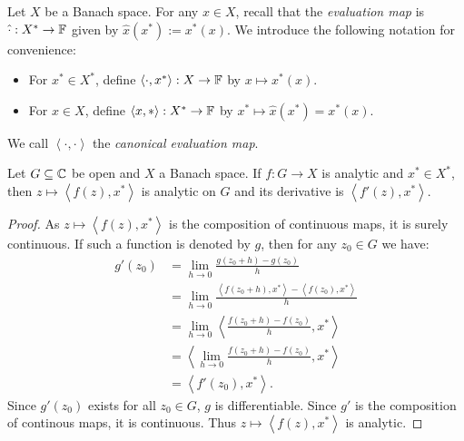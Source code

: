 \begin{remark}
	Let $X$ be a Banach space. For any $x \in X$, recall that the \emph{evaluation map} is $\hat{\cdot}:X^\ast \rightarrow \mathbb{F}$ given by $\hat{x}(x^\ast) := x^\ast(x)$. We introduce the following notation for convenience:
	\mbox{}
	\begin{itemize}[itemsep=1pt,topsep=3pt]
		\item For $x^\ast \in X^\ast$, define $\left<\cdot, x^\ast \right>:X \rightarrow \mathbb{F}$ by $x \mapsto x^\ast(x)$.
		\item For $x \in X$, define $\left<x,\ast \right> :X^\ast \rightarrow \mathbb{F}$ by $x^\ast \mapsto \hat{x}(x^\ast) = x^\ast (x)$.
	\end{itemize}
	We call $\left<\cdot,\cdot \right>$ the \emph{canonical evaluation map}.
\end{remark}


\begin{proposition}
	Let $G \subseteq \mathbb{C}$ be open and $X$ a Banach space. If $f:G \rightarrow X$ is analytic and $x^\ast \in X^\ast$, then $z \mapsto \left<f(z),x^\ast \right>$ is analytic on $G$ and its derivative is $\left<f'(z),x^\ast \right>$.	
\end{proposition}
	\begin{proof}
		As $z\mapsto \left<f(z),x^\ast \right>$ is the composition of continuous maps, it is surely continuous. If such a function is denoted by $g$, then for any $z_0 \in G$ we have:
		\begin{align*}
			g'(z_0)
			&= \lim_{h \rightarrow 0} \frac{g(z_0 + h) - g(z_0)}{h} \\
			&= \lim_{h \rightarrow 0} \frac{\left<f(z_0 + h),x^\ast \right> - \left<f(z_0),x^\ast \right>}{h} \\
			&= \lim_{h \rightarrow 0}\left<\frac{f(z_0 + h) - f(z_0)}{h},x^\ast \right> \\
			&= \left< \lim_{h \rightarrow 0}\frac{f(z_0 + h) - f(z_0)}{h} , x^\ast\right> \\
			&= \left<f'(z_0),x^\ast \right>.
		\end{align*}
		Since $g'(z_0)$ exists for all $z_0 \in G$, $g$ is differentiable. Since $g'$ is the composition of continous maps, it is continuous. Thus $z \mapsto \left<f(z), x^\ast \right>$ is analytic. 
	\end{proof}

